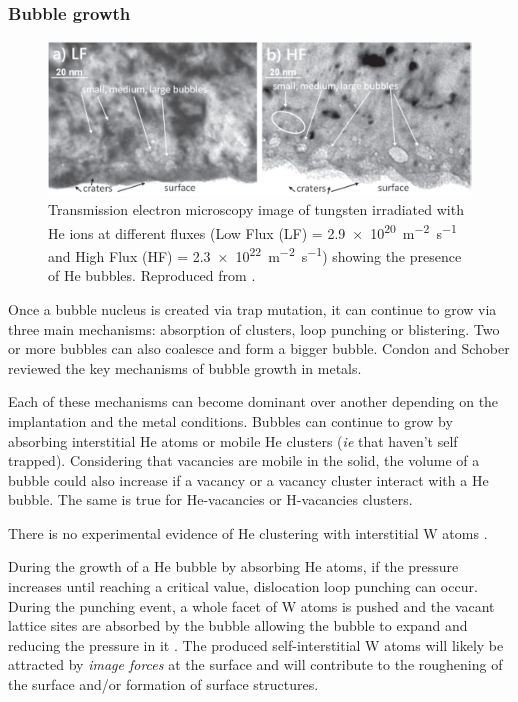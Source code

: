 \subsubsection{Bubble growth}

\begin{figure} [h!]
    \centering
    \includegraphics[width=\linewidth]{Figures/Chapter1/helium_bubbles_ialovega.jpg}
    \caption{Transmission electron microscopy image of tungsten irradiated with He ions at different fluxes (Low Flux (LF) = \SI{2.9e20}{m^{-2}.s^{-1}} and High Flux (HF) = \SI{2.3e22}{m^{-2}.s^{-1}}) showing the presence of He bubbles. Reproduced from \cite{ialovega_hydrogen_2020}.}
    \label{fig: he bubbles ialovega}
\end{figure}

Once a bubble nucleus is created via trap mutation, it can continue to grow via three main mechanisms: absorption of clusters, loop punching or blistering.
Two or more bubbles can also coalesce and form a bigger bubble.
Condon and Schober  reviewed the key mechanisms of bubble growth in metals.

Each of these mechanisms can become dominant over another depending on the implantation and the metal conditions. 
Bubbles can continue to grow by absorbing interstitial He atoms or mobile He clusters (\textit{ie} that haven't self trapped).
Considering that vacancies are mobile in the solid, the volume of a bubble could also increase if a vacancy or a vacancy cluster interact with a He bubble.
The same is true for He-vacancies or H-vacancies clusters.

There is no experimental evidence of He clustering with interstitial W atoms .

During the growth of a He bubble by absorbing He atoms, if the pressure increases until reaching a critical value, dislocation loop punching can occur.
During the punching event, a whole facet of W atoms is pushed and the vacant lattice sites are absorbed by the bubble allowing the bubble to expand and reducing the pressure in it .
The produced self-interstitial W atoms will likely be attracted by \textit{image forces} at the surface and will contribute to the roughening of the surface and/or formation of surface structures.


